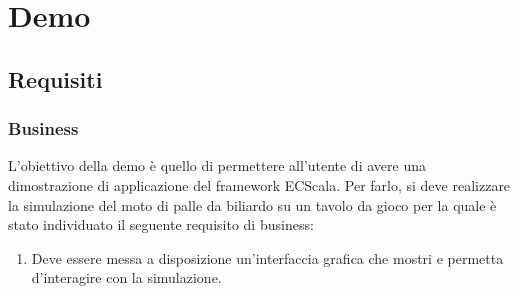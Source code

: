 \chapter{Demo}\label{ch:demo}

\section{Requisiti}\label{sec:demo-requisiti}

\subsection{Business}\label{subsec:demo-business}
L'obiettivo della demo è quello di permettere all'utente di avere una dimostrazione di applicazione del framework
ECScala.
Per farlo, si deve realizzare la simulazione del moto di palle da biliardo su un tavolo da gioco per la quale è
stato individuato il seguente requisito di business:
\begin{enumerate}[label=\textbf{\ref{subsec:demo-business}.\arabic*}]
    \item \label{itm:db1} Deve essere messa a disposizione un'interfaccia grafica che mostri e permetta d'interagire
    con la simulazione.
\end{enumerate}

